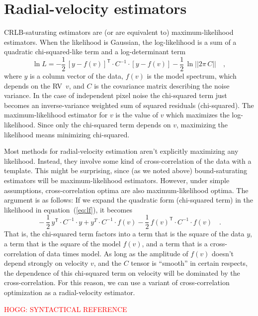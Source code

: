 \documentclass[modern]{aastex62}
\newcommand{\T}{^{\mathsf{T}}}
\newcommand{\todo}[1]{\textcolor{red}{#1}}  %
\newcommand{\acronym}[1]{{\small{#1}}}
\newcommand{\RV}{\acronym{RV}}
\newcommand{\CRLB}{\acronym{CRLB}}
\begin{document}
\section{Radial-velocity estimators}
\label{s:methods}

\CRLB-saturating estimators are (or are equivalent to)
maximum-likelihood estimators.
When the likelihood is Gaussian, the log-likelihood
is a sum of a quadratic chi-squared-like term and a log-determinant term
\begin{equation}
\ln L = -\frac{1}{2}\,[y - f(v)]\T\cdot C^{-1}\cdot [y - f(v)] - \frac{1}{2}\,\ln||2\pi\,C|| \quad ,
\label{eq:lf}
\end{equation}
where $y$ is a column vector of the data, $f(v)$ is the model spectrum,
which depends on the \RV\ $v$,
and $C$ is the covariance matrix describing the noise variance.
In the case of independent pixel noise the chi-squared term just becomes an
inverse-variance weighted sum of squared residuals (chi-squared).
The maximum-likelihood estimator for $v$ is the value of $v$ which maximizes
the log-likelihood.
Since only the chi-squared term depends on $v$, maximizing the likelihood
means minimizing chi-squared.

Most methods for radial-velocity estimation aren't explicitly maximizing
any likelihood.
Instead, they involve some kind of
cross-correlation of the data with a template.
This might be surprising, since (as we noted above) bound-saturating
estimators will be maximum-likelihood estimators.
However, under simple assumptions, cross-correlation optima are
also maximum-likelihood optima. The argument is as follows:
If we expand the quadratic form (chi-squared term) in the
likelihood in equation~(\ref{eq:lf}), it becomes
\begin{equation}
{}-\frac{1}{2}\,y\T\cdot C^{-1}\cdot y + y^T\cdot C^{-1}\cdot f(v) 
-\frac{1}{2}\,f(v)\T\cdot C^{-1}\cdot f(v) \quad.
\end{equation}
That is, the chi-squared term factors into a term that is the square
of the data $y$, a term that is the square of the model $f(v)$,
and a term that is a cross-correlation of data times model.
As long as the amplitude of $f(v)$ doesn't depend strongly on velocity $v$,
and the $C$ tensor is ``smooth'' in certain respects, the dependence of this
chi-squared term on velocity will be dominated by the
cross-correlation.
For this reason, we can use a variant of cross-correlation
optimization as a radial-velocity estimator.

\todo{HOGG: SYNTACTICAL REFERENCE}
\end{document}
